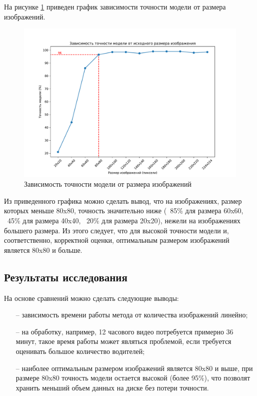 На рисунке \ref{fig:sizes_acc_bench} приведен график зависимости точности модели от размера изображений.
\begin{figure}[H]
	\centering
	\includegraphics[scale=0.6]{img/sizes_acc_bench.pdf}
	\caption{Зависимость точности модели от размера изображений}
	\label{fig:sizes_acc_bench}
\end{figure}

Из приведенного графика можно сделать вывод, что на изображениях, размер которых меньше 80x80, точность значительно ниже (~85\% для размера 60x60, ~45\% для размера 40x40, ~20\% для размера 20x20), нежели на изображениях большего размера. Из этого следует, что для высокой точности модели и, соответственно, корректной оценки, оптимальным размером изображений является 80x80 и больше.

\newpage
\subsection{Результаты исследования}
На основе сравнений можно сделать следующие выводы:
\begin{itemize}[leftmargin=1.6\parindent]
	\item[--] зависимость времени работы метода от количества изображений линейно;
	\item[--] на обработку, например, 12 часового видео потребуется примерно 36 минут, такое время работы может являться проблемой, если требуется оценивать большое количество водителей;
	\item[--] наиболее оптимальным размером изображений является 80x80 и выше, при размере 80x80 точность модели остается высокой (более 95\%), что позволят хранить меньший объем данных на диске без потери точности.
\end{itemize}


\pagebreak